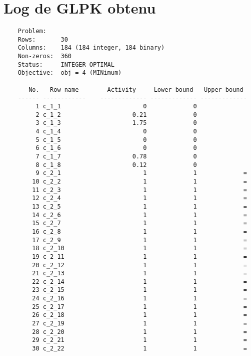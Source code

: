 \documentclass{article}[A4]
\begin{document}
\section{Log de GLPK obtenu}
\begin{verbatim}
	Problem:    
	Rows:       30
	Columns:    184 (184 integer, 184 binary)
	Non-zeros:  360
	Status:     INTEGER OPTIMAL
	Objective:  obj = 4 (MINimum)
	
	   No.   Row name        Activity     Lower bound   Upper bound
	------ ------------    ------------- ------------- -------------
	     1 c_1_1                       0             0               
	     2 c_1_2                    0.21             0               
	     3 c_1_3                    1.75             0               
	     4 c_1_4                       0             0               
	     5 c_1_5                       0             0               
	     6 c_1_6                       0             0               
	     7 c_1_7                    0.78             0               
	     8 c_1_8                    0.12             0               
	     9 c_2_1                       1             1             = 
	    10 c_2_2                       1             1             = 
	    11 c_2_3                       1             1             = 
	    12 c_2_4                       1             1             = 
	    13 c_2_5                       1             1             = 
	    14 c_2_6                       1             1             = 
	    15 c_2_7                       1             1             = 
	    16 c_2_8                       1             1             = 
	    17 c_2_9                       1             1             = 
	    18 c_2_10                      1             1             = 
	    19 c_2_11                      1             1             = 
	    20 c_2_12                      1             1             = 
	    21 c_2_13                      1             1             = 
	    22 c_2_14                      1             1             = 
	    23 c_2_15                      1             1             = 
	    24 c_2_16                      1             1             = 
	    25 c_2_17                      1             1             = 
	    26 c_2_18                      1             1             = 
	    27 c_2_19                      1             1             = 
	    28 c_2_20                      1             1             = 
	    29 c_2_21                      1             1             = 
	    30 c_2_22                      1             1             = 
	

\end{verbatim}
\end{document}
